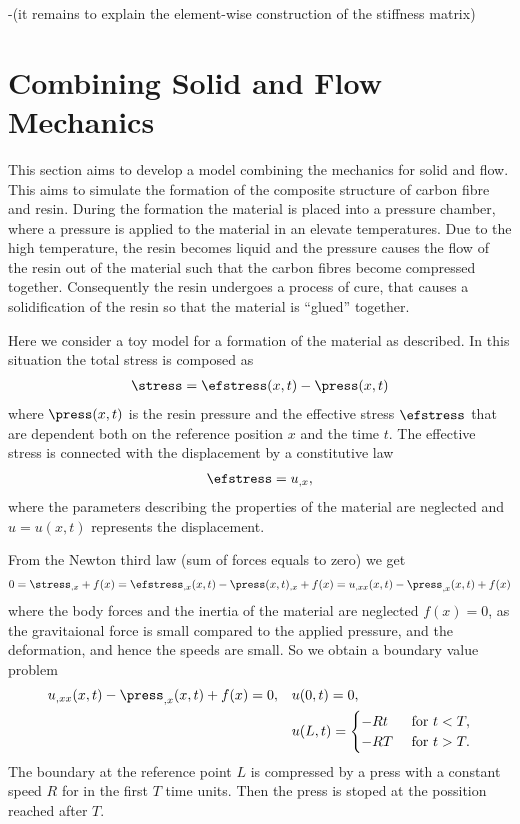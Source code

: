 \documentclass[twoside,a4paper,12pt]{article}
\newcommand{\note}[1]{{\color{red}\newline(#1)}}
\newcommand{\+}[2]{\newcommand#1{{\color{\notcolor}#2}}}
\newcommand{\1}[2]{\newcommand{#1}[1]{{\color{\notcolor}#2}}}
\newcommand{\2}[2]{\newcommand{#1}[2]{{\color{\notcolor}#2}}}
\begin{document}
-\note{it remains to explain the element-wise construction of the stiffness matrix}

\section{Combining Solid and Flow Mechanics}

This section aims to develop a model combining the mechanics for solid
and flow. This aims to simulate the formation of the composite
structure of carbon fibre and resin. During the formation the material
is placed into a pressure chamber, where a pressure is applied to the
material in an elevate temperatures. Due to the high temperature, the
resin becomes liquid and the pressure causes the flow of the resin out
of the material such that the carbon fibres become compressed
together. Consequently the resin undergoes a process of cure, that
causes a solidification of the resin so that the material is ``glued''
together.

Here we consider a toy model for a formation of the material as
described.  In this situation the total stress is composed as
%
\begin{align}
\stress = \efstress(x,t) - \press(x,t)
\end{align}
%
where $\press(x,t)$ is the resin pressure and the effective stress
$\efstress$ that are dependent both on the reference position $x$ and
the time $t$. The effective stress is connected with the
displacement by a constitutive law
\begin{align}
\efstress = u_{,x},
\end{align}
%
where the parameters describing the properties of the material are
neglected and $u= u(x,t)$ represents the displacement.

From the Newton third law (sum of forces equals to zero) we get
%
\begin{align}
  0 =
  \stress_{,x} + f(x) =
  \efstress_{,x}(x,t) - \press(x,t)_{,x} + f(x) =
  u_{,xx}(x,t) - \press_{,x}(x,t) + f(x) 
\end{align}
%
where the body forces and the inertia of the material are neglected
$f(x) = 0$, as the gravitaional force is small compared to the applied
pressure, and the deformation, and hence the speeds are small.
%
So we obtain a boundary value problem
%
\begin{align}
  u_{,xx}(x,t) - \press_{,x}(x,t) + f(x) \label{eq:bvp-flow}
  = 0 , &&& u(0,t) = 0,\\\nonumber
        &&&u(L,t) =
            \begin{cases}
              -Rt &\text{ for } t < T,\\
              -RT &\text{ for } t > T.
            \end{cases} 
\end{align}
%
The boundary at the reference point $L$ is compressed by a press with
a constant speed $R$ for in the first $T$ time units. Then the press
is stoped at the possition reached after $T$.
\end{document}
